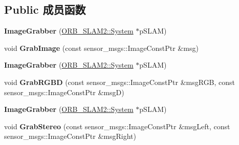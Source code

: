 \subsection*{Public 成员函数}
\begin{DoxyCompactItemize}
\item 
\hypertarget{classImageGrabber_aa7692b812eafa9a76e82b96794999239}{{\bfseries Image\-Grabber} (\hyperlink{classORB__SLAM2_1_1System}{O\-R\-B\-\_\-\-S\-L\-A\-M2\-::\-System} $\ast$p\-S\-L\-A\-M)}\label{classImageGrabber_aa7692b812eafa9a76e82b96794999239}

\item 
\hypertarget{classImageGrabber_a66758ed685acbf1a7e77b3325001e47c}{void {\bfseries Grab\-Image} (const sensor\-\_\-msgs\-::\-Image\-Const\-Ptr \&msg)}\label{classImageGrabber_a66758ed685acbf1a7e77b3325001e47c}

\item 
\hypertarget{classImageGrabber_aa7692b812eafa9a76e82b96794999239}{{\bfseries Image\-Grabber} (\hyperlink{classORB__SLAM2_1_1System}{O\-R\-B\-\_\-\-S\-L\-A\-M2\-::\-System} $\ast$p\-S\-L\-A\-M)}\label{classImageGrabber_aa7692b812eafa9a76e82b96794999239}

\item 
\hypertarget{classImageGrabber_ab6df23b898365aa3df99628e4c925aee}{void {\bfseries Grab\-R\-G\-B\-D} (const sensor\-\_\-msgs\-::\-Image\-Const\-Ptr \&msg\-R\-G\-B, const sensor\-\_\-msgs\-::\-Image\-Const\-Ptr \&msg\-D)}\label{classImageGrabber_ab6df23b898365aa3df99628e4c925aee}

\item 
\hypertarget{classImageGrabber_aa7692b812eafa9a76e82b96794999239}{{\bfseries Image\-Grabber} (\hyperlink{classORB__SLAM2_1_1System}{O\-R\-B\-\_\-\-S\-L\-A\-M2\-::\-System} $\ast$p\-S\-L\-A\-M)}\label{classImageGrabber_aa7692b812eafa9a76e82b96794999239}

\item 
\hypertarget{classImageGrabber_a640450feb6e5df2cb0b2aae7574367c2}{void {\bfseries Grab\-Stereo} (const sensor\-\_\-msgs\-::\-Image\-Const\-Ptr \&msg\-Left, const sensor\-\_\-msgs\-::\-Image\-Const\-Ptr \&msg\-Right)}\label{classImageGrabber_a640450feb6e5df2cb0b2aae7574367c2}

\end{DoxyCompactItemize}
